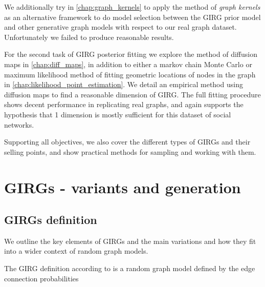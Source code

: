 We additionally try in \cref{chap:graph_kernels} to apply the method of \textit{graph kernels} as an alternative framework to do model selection between the GIRG prior model and other generative graph models with respect to our real graph dataset. Unfortunately we failed to produce reasonable results.



For the second task of GIRG posterior fitting we explore the method of diffusion maps in \cref{chap:diff_maps}, in addition to either a markov chain Monte Carlo or maximum likelihood method of fitting geometric locations of nodes in the graph in \cref{chap:likelihood_point_estimation}. We detail an empirical method using diffusion maps to find a reasonable dimension of GIRG. The full fitting procedure shows decent performance in replicating real graphs, and again supports the hypothesis that 1 dimension is mostly sufficient for this dataset of social networks.

Supporting all objectives, we also cover the different types of GIRGs and their selling points, and show practical methods for sampling and working with them.



\chapter{GIRGs - variants and generation}
\minitoc
\section{GIRGs definition}
\label{sec:GIRG_def}
We outline the key elements of GIRGs and the main variations and how they fit into a wider context of random graph models.

The GIRG definition according to \cite{bringmann2019geometric} is a random graph model defined by the edge connection probabilities



